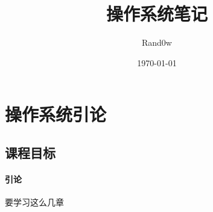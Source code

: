 \documentclass[UTF8]{ctexart}
\title{操作系统笔记}
\author{Rand0w}
\date{\today}
\begin{document}
 \maketitle
 \tableofcontents
 \section{操作系统引论}
 \subsection{课程目标}
 \paragraph{引论} 要学习这么几章


 
\end{document}
